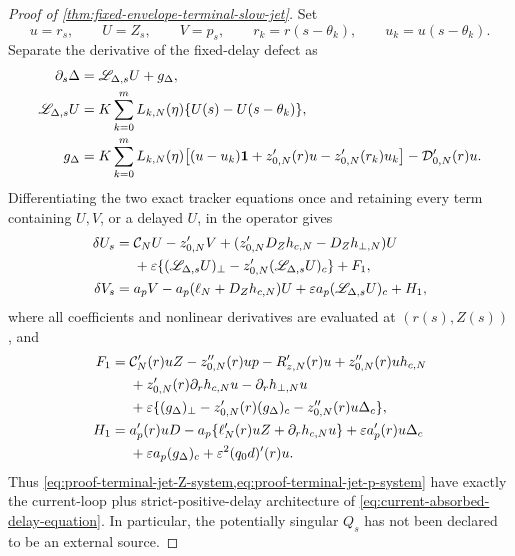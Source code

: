 \begin{proof}[Proof of
\cref{thm:fixed-envelope-terminal-slow-jet}]
Set
\[
 u=r_s,\qquad U=Z_s,\qquad V=p_s,\qquad
 r_k=r(s-\theta_k),\qquad u_k=u(s-\theta_k).
\]
Separate the derivative of the fixed-delay defect as
\begin{align}
 \partial_s\Delta
 &=\mathscr L_{\Delta,s}U+g_\Delta,\notag\\
 \mathscr L_{\Delta,s}U
 &=K\sum_{k=0}^mL_{k,N}(\eta)
       \{U(s)-U(s-\theta_k)\},\notag\\
 g_\Delta
 &=K\sum_{k=0}^mL_{k,N}(\eta)
   \bigl[(u-u_k)\mathbf1+z_{0,N}'(r)u
                    -z_{0,N}'(r_k)u_k\bigr]
       -\mathcal D_{0,N}'(r)u.                  \label{eq:proof-terminal-jet-delay-split}
\end{align}
Differentiating the two exact tracker equations once and retaining every
term containing \(U,V\), or a delayed \(U\), in the operator gives
\begin{align}
 \delta U_s={}&\mathcal C_NU-z_{0,N}'V
 +(z_{0,N}'D_Zh_{c,N}-D_Zh_{\perp,N})U\notag\\
 &+\varepsilon\{(\mathscr L_{\Delta,s}U)_\perp
        -z_{0,N}'(\mathscr L_{\Delta,s}U)_c\}+F_1,
                                                        \label{eq:proof-terminal-jet-Z-system}\\
 \delta V_s={}&a_pV-a_p(\ell_N+D_Zh_{c,N})U
       +\varepsilon a_p(\mathscr L_{\Delta,s}U)_c+H_1,
                                                        \label{eq:proof-terminal-jet-p-system}
\end{align}
where all coefficients and nonlinear derivatives are evaluated at
\((r(s),Z(s))\), and
\begin{align}
 F_1={}&\mathcal C_N'(r)uZ-z_{0,N}''(r)up-R_{z,N}'(r)u
       +z_{0,N}''(r)u h_{c,N}\notag\\
 &+z_{0,N}'(r)\partial_rh_{c,N}u
       -\partial_rh_{\perp,N}u\notag\\
 &+\varepsilon\{(g_\Delta)_\perp-z_{0,N}'(r)(g_\Delta)_c
             -z_{0,N}''(r)u\Delta_c\},          \label{eq:proof-terminal-jet-F1}\\
 H_1={}&a_p'(r)uD
       -a_p\{\ell_N'(r)uZ+\partial_rh_{c,N}u\}
       +\varepsilon a_p'(r)u\Delta_c\notag\\
 &+\varepsilon a_p(g_\Delta)_c
       +\varepsilon^2(q_0d)'(r)u.                \label{eq:proof-terminal-jet-H1}
\end{align}
Thus \cref{eq:proof-terminal-jet-Z-system,eq:proof-terminal-jet-p-system}
have exactly the current-loop plus strict-positive-delay architecture of
\cref{eq:current-absorbed-delay-equation}.  In particular, the potentially
singular \(Q_s\) has not been declared to be an external source.


\end{proof}
